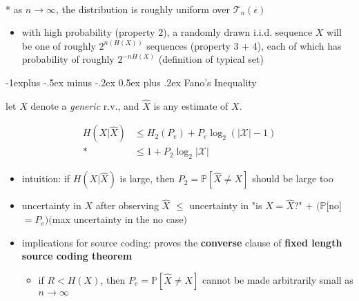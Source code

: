\documentclass[10pt, landscape]{article}
\makeatletter
\renewcommand{\subsection}{\@startsection{subsection}{2}{0mm}%
  {-1explus -.5ex minus -.2ex}%
  {0.5ex plus .2ex}%
{\normalfont\normalsize\bfseries}}
\makeatother
\begin{document}
\begin{multicols*}{4}
  \begin{tightcenter}
    \\* as $n \to \infty$, the distribution is roughly uniform over $\mathcal{T}_n(\epsilon)$
  \end{tightcenter}

  \begin{itemize}
    \item with high probability (property 2), a randomly drawn i.i.d. sequence $X$ will be one of roughly $2^{n(H(X))}$ sequences (property 3 + 4),
      each of which has probability of roughly $2^{-nH(X)}$ (definition of typical set)
  \end{itemize}


  \subsection{Fano's Inequality}

  let $X$ denote a \textit{generic} r.v., and $\hat{X}$ is any estimate of $X$.

  \begin{tightcenter}
    \begin{align*}
      H(X \vert \hat{X}) &\leq H_2(P_e) + P_e\log_2 (\vert\mathcal{X}\vert -1)  \\*
                         &\leq 1 + P_2 \log_2 \vert \mathcal{X} \vert
    \end{align*}
  \end{tightcenter}

  \begin{itemize}
    \item intuition: if $H(X \vert \hat{X})$ is large, then $P_2 = \mathbb{P}[\hat{X} \neq X]$ should be large too
    \item uncertainty in $X$ after observing $\hat{X}$ $\leq$ uncertainty in "is $X = \hat{X}$?" + $(\mathbb{P}$[no]$=P_e)($max uncertainty in the no case$)$
    \item implications for source coding: proves the \textbf{converse} clause of \textbf{fixed length source coding theorem}
      \begin{itemize}
        \item if $R < H(X)$, then $P_e = \mathbb{P}[\hat{X} \neq X]$ cannot be made arbitrarily small as $n \to \infty$
      \end{itemize}
  \end{itemize}



\end{multicols*}
\end{document}
